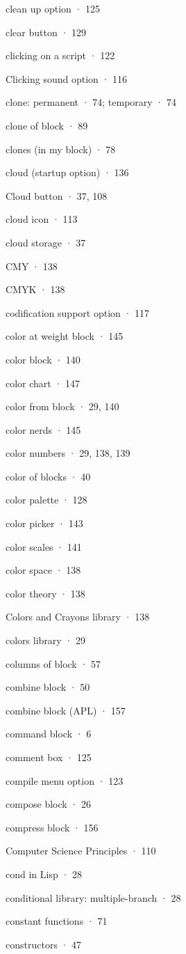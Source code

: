 clean up option · 125

clear button · 129

clicking on a script · 122

Clicking sound option · 116

clone: permanent · 74; temporary · 74

clone of block · 89

clones (in my block) · 78

cloud (startup option) · 136

Cloud button · 37, 108

cloud icon · 113

cloud storage · 37

CMY · 138

CMYK · 138

codification support option · 117

color at weight block · 145

color block · 140

color chart · 147

color from block · 29, 140

color nerds · 145

color numbers · 29, 138, 139

color of blocks · 40

color palette · 128

color picker · 143

color scales · 141

color space · 138

color theory · 138

Colors and Crayons library · 138

colors library · 29

columns of block · 57

combine block · 50

combine block (APL) · 157

command block · 6

comment box · 125

compile menu option · 123

compose block · 26

compress block · 156

Computer Science Principles · 110

cond in Lisp · 28

conditional library: multiple-branch · 28

constant functions · 71

constructors · 47

